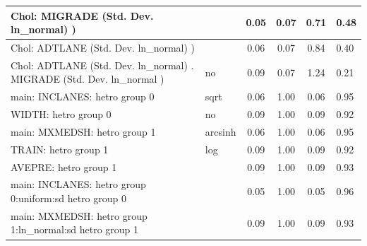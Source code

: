 \begin{table}
\begin{center}
\begin{tabular}{|l|l|c|c|c|l|}
			\hline
			 Chol: MIGRADE (Std. Dev. ln_normal) ) &  & 0.05 & 0.07 & 0.71 & 0.48 \\
			\hline
			 Chol: ADTLANE (Std. Dev. ln_normal) ) &  & 0.06 & 0.07 & 0.84 & 0.40 \\
			\hline
			 Chol: ADTLANE (Std. Dev. ln_normal) . MIGRADE (Std. Dev.   ln_normal ) & no & 0.09 & 0.07 & 1.24 & 0.21 \\
			\hline
			main: INCLANES: hetro group 0 & sqrt & 0.06 & 1.00 & 0.06 & 0.95 \\
			\hline
			WIDTH: hetro group 0 & no & 0.09 & 1.00 & 0.09 & 0.92 \\
			\hline
			main: MXMEDSH: hetro group 1 & arcsinh & 0.06 & 1.00 & 0.06 & 0.95 \\
			\hline
			TRAIN: hetro group 1 & log & 0.09 & 1.00 & 0.09 & 0.92 \\
			\hline
			AVEPRE: hetro group 1 &  & 0.09 & 1.00 & 0.09 & 0.93 \\
			\hline
			main: INCLANES: hetro group 0:uniform:sd  hetro group 0 &  & 0.05 & 1.00 & 0.05 & 0.96 \\
			\hline
			main: MXMEDSH: hetro group 1:ln_normal:sd  hetro group 1 &  & 0.09 & 1.00 & 0.09 & 0.93 \\
			\hline
		\end{tabular}
	\end{center}
\end{table}